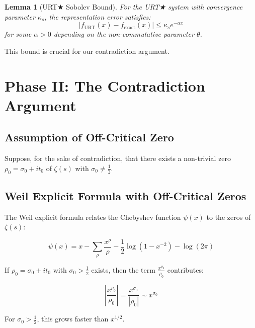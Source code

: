 \documentclass[11pt,a4paper]{article}
\theoremstyle{plain}
\newtheorem{lemma}[theorem]{Lemma}
\theoremstyle{definition}
\begin{document}
\begin{lemma}[URT★ Sobolev Bound]\label{lem:sobolev}
For the URT★ system with convergence parameter $\kappa_s$, the representation error satisfies:
\begin{equation}
\left|f_{\text{URT}}(x) - f_{\text{exact}}(x)\right| \leq \kappa_s e^{-\alpha x}
\end{equation}
for some $\alpha > 0$ depending on the non-commutative parameter $\theta$.
\end{lemma}

This bound is crucial for our contradiction argument.

\section{Phase II: The Contradiction Argument}

\subsection{Assumption of Off-Critical Zero}

Suppose, for the sake of contradiction, that there exists a non-trivial zero $\rho_0 = \sigma_0 + it_0$ of $\zeta(s)$ with $\sigma_0 \neq \frac{1}{2}$.

\subsection{Weil Explicit Formula with Off-Critical Zeros}

The Weil explicit formula relates the Chebyshev function $\psi(x)$ to the zeros of $\zeta(s)$:

\begin{equation}\label{eq:weil}
\psi(x) = x - \sum_{\rho} \frac{x^{\rho}}{\rho} - \frac{1}{2}\log(1-x^{-2}) - \log(2\pi)
\end{equation}

If $\rho_0 = \sigma_0 + it_0$ with $\sigma_0 > \frac{1}{2}$ exists, then the term $\frac{x^{\rho_0}}{\rho_0}$ contributes:

\begin{equation}
\left|\frac{x^{\rho_0}}{\rho_0}\right| = \frac{x^{\sigma_0}}{|\rho_0|} \sim x^{\sigma_0}
\end{equation}

For $\sigma_0 > \frac{1}{2}$, this grows faster than $x^{1/2}$.
\end{document}
